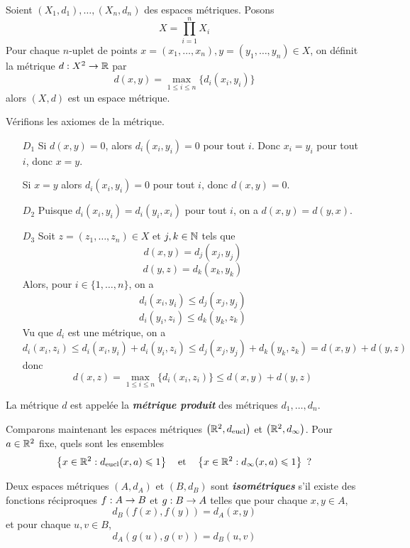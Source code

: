 \documentclass[french]{article}
\begin{document}
\begin{theoreme}
  Soient $(X_1, d_1), \dots, (X_n, d_n)$ des espaces métriques. Posons $$X = \prod_{i=1}^{n} X_i$$
  Pour chaque $n$-uplet de points $x = (x_1, \dots, x_n), y = (y_1, \dots, y_n) \in X$, on définit la métrique
  $d: X^2 \rightarrow \mathbb{R}$ par
  $$ d(x, y) = \max_{1 \leq i \leq n} \big\{ d_i(x_i, y_i)\big\}$$
  alors $(X, d)$ est un espace métrique.

  \tcblower
  \begin{preuve}
    Vérifions les axiomes de la métrique.
    \begin{itemize}
      \item[$D_1$] Si $d(x, y) = 0$, alors $d_i(x_i, y_i) = 0$ pour tout $i$. Donc $x_i = y_i$ pour tout $i$, donc $x = y$.
        \par Si $x = y$ alors $d_i(x_i, y_i) = 0$ pour tout $i$, donc $d(x, y) = 0$.
      \item[$D_2$] Puisque $d_i(x_i, y_i) = d_i(y_i, x_i)$ pour tout $i$, on a $d(x, y) = d(y, x)$.
      \item[$D_3$] Soit $z = (z_1, \dots, z_n) \in X$ et $j, k \in \mathbb{N}$ tels que
        $$ d(x, y) = d_j(x_j, y_j) $$
        $$ d(y, z) = d_k(x_k, y_k)$$
        Alors, pour $i \in \{1, \dots, n\}$, on a
        $$d_i(x_i, y_i) \leq d_j(x_j, y_j)$$
        $$d_i(y_i, z_i) \leq d_k(y_k, z_k)$$
        Vu que $d_i$ est une métrique, on a
        $$d_i(x_i, z_i) \leq d_i(x_i, y_i) + d_i(y_i, z_i) \leq d_j(x_j, y_j) + d_k(y_k, z_k) = d(x, y) + d(y, z)$$
        donc 
        $$d(x, z) = \max_{1 \leq i \leq n} \big\{ d_i(x_i, z_i) \big\} \leq d(x, y) + d(y, z)$$
    \end{itemize}
  \end{preuve}
\end{theoreme}

\begin{remarque}
  La métrique $d$ est appelée la \textbf{\it métrique produit} des métriques $d_1, \dots, d_n$.
\end{remarque}

Comparons maintenant les espaces métriques $\left(\mathbb{R}^2, d_\text{eucl} \right)$ et $\left(\mathbb{R}^2, d_\infty \right)$. Pour $a \in \mathbb{R}^2$ fixe, quels sont les ensembles
$$ \left\{ x \in \mathbb{R}^2 : d_\text{eucl}(x, a) \leqslant 1 \right\} \quad \text{et} \quad \left\{ x \in \mathbb{R}^2 : d_\infty(x, a) \leqslant 1 \right\} \text{ ?}$$



\begin{definition}\label{def:isom}
  Deux espaces métriques $(A, d_A)$ et $(B, d_B)$ sont \textbf{\it isométriques} s'il existe des fonctions réciproques $f: A \rightarrow B$ et $g: B \rightarrow A$ telles que pour chaque $x, y \in A$,
  $$ d_B(f(x), f(y)) = d_A(x, y)$$
  et pour chaque $u, v \in B$,
  $$ d_A(g(u), g(v)) = d_B(u, v)$$
\end{definition}
\end{document}
